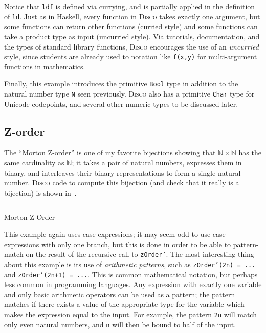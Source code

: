 \documentclass[submission,copyright,creativecommons]{eptcs}
\newcommand{\disco}{\textsc{Disco}\xspace}
\newcommand{\pref}[1]{\prettyref{#1}}
\newcommand{\N}{\mathbb{N}}
\begin{document}
Notice that \verb|ldf| is defined via currying, and is partially
applied in the definition of \verb|ld|. Just as in Haskell, every
function in \disco takes exactly one argument, but some
functions can return other functions (curried style) and some functions
can take a product type as input (uncurried style).  Via tutorials,
documentation, and the types of standard library functions, \disco
encourages the use of an \emph{uncurried} style, since students are
already used to notation like \verb|f(x,y)| for multi-argument
functions in mathematics.

Finally, this example introduces the primitive \verb|Bool| type in
addition to the natural number type \verb|N| seen previously.  \disco
also has a primitive \verb|Char| type for Unicode codepoints, and
several other numeric types to be discussed later.

\subsection{Z-order}
\label{sec:zorder}

The ``Morton Z-order'' is one of my favorite bijections showing that
$\N \times \N$ has the same cardinality as $\N$; it takes a pair of
natural numbers, expresses them in binary, and interleaves their
binary representations to form a single natural number.  \disco code
to compute this bijection (and check that it really is a bijection) is
shown in~\pref{lst:zorder}.

\begin{listing}[!htp]
\inputminted{text}{examples/zorder.disco}
\caption{Morton Z-Order}
\label{lst:zorder}
\end{listing}

This example again uses case expressions; it may seem odd to use case
expressions with only one branch, but this is done in order to be able
to pattern-match on the result of the recursive call to
\texttt{zOrder'}.  The most interesting thing about this
example is its use of \emph{arithmetic patterns}, such as %
\texttt{zOrder'(2n) = ...} and
\texttt{zOrder'(2n+1) = ...}.  This is common mathematical
notation, but perhaps less common in programming languages.  Any
expression with exactly one variable and only basic arithmetic
operators can be used as a pattern; the pattern matches if there
exists a value of the appropriate type for the variable which makes
the expression equal to the input.  For example, the pattern
\texttt{2n} will match only even natural numbers, and \texttt{n} will
then be bound to half of the input.
\end{document}
